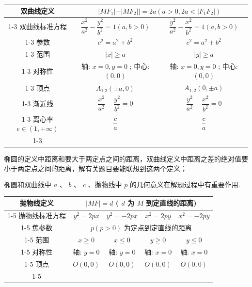 \begin{center}
\begin{tabular}{|c|c|c|}
\hline
双曲线定义 & \multicolumn{2}{|c|}{$\left. {\left. \right| M{F}_{1}\left| -\right| M{F}_{2}\left| \right|  = {2a}\left( {a > 0,{2a} < }\right. \left| {{F}_{1}{F}_{2}}\right| }\right)$} \\
\cline{1-3}
双曲线标准方程 & $\dfrac{{x}^{2}}{{a}^{2}} - \dfrac{{y}^{2}}{{b}^{2}} = 1\left( {a,b > 0}\right)$ & $\dfrac{{y}^{2}}{{a}^{2}} - \dfrac{{x}^{2}}{{b}^{2}} = 1\left( {a,b > 0}\right)$ \\
\cline{1-3}
参数 & ${c}^{2} = {a}^{2} + {b}^{2}$ & ${c}^{2} = {a}^{2} + {b}^{2}$ \\
\cline{1-3}
范围 & $\left| x\right|  \geq  a$ & $\left| y\right|  \geq  a$ \\
\cline{1-3}
对称性 & 轴: $x = 0,y = 0$ ; 中心: $\left( {0,0}\right)$ & 轴: $x = 0,y = 0$ ; 中心: $\left( {0,0}\right)$ \\
\cline{1-3}
顶点 & ${A}_{1.2}\left( {\pm a,0}\right)$ & ${A}_{1,2}\left( {0, \pm  a}\right)$ \\
\cline{1-3}
渐近线 & $\dfrac{{x}^{2}}{{a}^{2}} - \dfrac{{y}^{2}}{{b}^{2}} = 0$ & $\dfrac{{y}^{2}}{{a}^{2}} - \dfrac{{x}^{2}}{{b}^{2}} = 0$ \\
\cline{1-3}
离心率 $e \in  \left( {1, + \infty }\right)$ & $\dfrac{c}{a}$ & $\dfrac{c}{a}$ \\
\cline{1-3}
\hline
\end{tabular}
\end{center}

  椭圆的定义中距离和要大于两定点之间的距离，双曲线定义中距离之差的绝对值要小于两定点之间的距离，解有关题目要能联想到这两个定义；

   椭圆和双曲线中 $a$ 、 $b$ 、 $c$ 、抛物线中 $p$ 的几何意义在解题过程中有重要作用.

\begin{center}
\begin{tabular}{|c|c|c|c|c|}
\hline
抛物线定义 & \multicolumn{4}{|c|}{$\left| {MF}\right|  = d$ ( $d$ 为 $M$ 到定直线的距离)} \\
\cline{1-5}
抛物线标准方程 & ${y}^{2} = {2px}$ & ${y}^{2} =  - {2px}$ & ${x}^{2} = {2py}$ & ${x}^{2} =  - {2py}$ \\
\cline{1-5}
焦参数 & \multicolumn{4}{|c|}{$p\left( {p > 0}\right)$ 为定点到定直线的距离} \\
\cline{1-5}
范围 & $x \geq  0$ & $x \leq  0$ & $y \geq  0$ & $y \leq  0$ \\
\cline{1-5}
对称性 & 轴: $y = 0$ & 轴: $y = 0$ & 轴: $x = 0$ & 轴: $x = 0$ \\
\cline{1-5}
顶点 & $O\left( {0,0}\right)$ & $O\left( {0,0}\right)$ & $O\left( {0,0}\right)$ & $O\left( {0,0}\right)$ \\
\cline{1-5}
\hline
\end{tabular}
\end{center}

